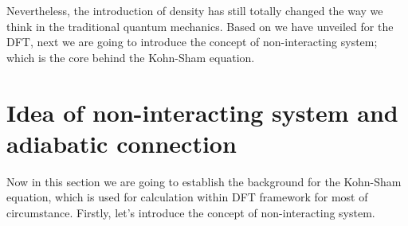 Nevertheless, the introduction of density has still totally changed
the way we think in the traditional quantum mechanics. Based on we
have unveiled for the DFT, next we are going to introduce the concept
of non-interacting system; which is the core behind the Kohn-Sham
equation.


\section{Idea of non-interacting system and adiabatic connection}
%
%
Now in this section we are going to establish the background for the
Kohn-Sham equation, which is used for calculation within DFT
framework for most of circumstance. Firstly, let's introduce the
concept of non-interacting system.


